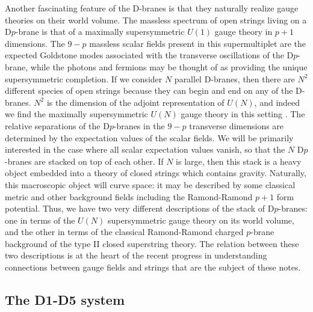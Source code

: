 Another fascinating feature of the D-branes is that they naturally realize
gauge theories on their world volume. The massless spectrum of open strings
living on a D$p$-brane is that of a maximally supersymmetric $U(1)$
gauge theory in $p+1$ dimensions. The $9-p$ massless
scalar fields present in this supermultiplet are the expected Goldstone 
modes associated with the transverse oscillations of the D$p$-brane,
while the photons and fermions
may be thought of as providing the unique supersymmetric
completion.
If we consider $N$ parallel D-branes,
then there are $N^2$ different species of open strings because they can
begin and end on any of the D-branes. 
$N^2$ is the dimension of the adjoint representation of $U(N)$,
and indeed we find the maximally supersymmetric $U(N)$ 
gauge theory in this setting \cite{Witten}.
The relative separations of the D$p$-branes in the $9-p$ transverse
dimensions are determined by the expectation values of the scalar fields.
We will be primarily interested in the case where all scalar expectation
values vanish, so that the $N$ D$p$-branes are stacked on top of each other.
If $N$ is large, then this stack is a heavy object embedded into a theory
of closed strings which contains gravity. Naturally, this macroscopic
object will curve space: it may be described by some classical metric
and other background fields including the Ramond-Ramond 
$p+1$ form potential.
Thus, we have two very different descriptions of the stack of D$p$-branes:
one in terms of the $U(N)$ supersymmetric gauge theory on its world volume,
and the other in terms of the classical
Ramond-Ramond charged $p$-brane background of the type II
closed superstring theory. The relation between these two descriptions
is at the heart of the recent progress in understanding 
connections between gauge fields and strings that are the subject of
these notes.

\subsection{The D1-D5 system}

